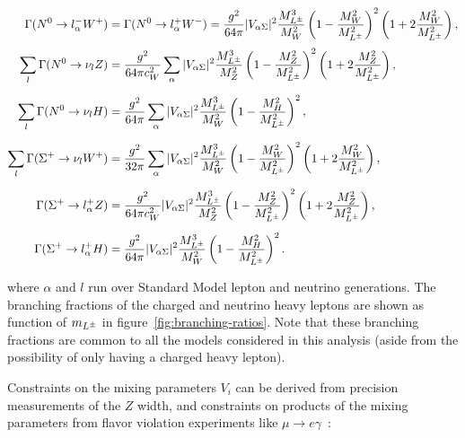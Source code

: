 %
\begin{align}
\label{eq:Gammatr0W}
\Gamma(\lzero \to l_\alpha^- W^+) &=  \Gamma(\lzero \to l_\alpha^+ W^-) =
\frac{g^2}{64 \pi} |V_{\alpha\Sigma}|^2
\frac{M_{\lpm}^3}{M_W^2} \left( 1- \frac{M_W^2}{M_{\lpm}^2} \right)^2 
\left( 1 + 2 \frac{M_W^2}{M_{\lpm}^2} \right) , 
\\[0.1cm]
\label{eq:Gammatr0Z}
\sum_l\Gamma(\lzero \to \nu_l Z) &=  \frac{g^2}{64 \pi c_W^2} 
\sum_\alpha |V_{\alpha\Sigma}|^2
\frac{M_{\lpm}^3}{M_Z^2} \left( 1- \frac{M_Z^2}{M_{\lpm}^2} \right)^2 
\left( 1 + 2 \frac{M_Z^2}{M_{\lpm}^2}\right),
\\[0.2cm]
\label{eq:Gammatr0h}
\sum_l\Gamma(\lzero \to \nu_l H) &=  \frac{g^2}{64 \pi} 
\sum_\alpha |V_{\alpha\Sigma}|^2
\frac{M_{\lpm}^3}{M_W^2} \left( 1- \frac{M_H^2}{M_{\lpm}^2} \right)^2 ,
\\[0.2cm]
\label{eq:Gammatr+W}
\sum_l\Gamma(\Sigma^+ \to \nu_l W^+) &= 
\frac{g^2}{32 \pi} \sum_\alpha |V_{\alpha\Sigma}|^2
\frac{M_{\lpm}^3}{M_W^2} \left( 1- \frac{M_W^2}{M_{\lpm}^2} \right)^2 
\left( 1 + 2 \frac{M_W^2}{M_{\lpm}^2} \right) ,
\\[0.2cm]
\label{eq:Gammatr+Z}
\Gamma(\Sigma^+ \to l_\alpha^+ Z) &= 
\frac{g^2}{64 \pi c_W^2} |V_{\alpha\Sigma}|^2
\frac{M_{\lpm}^3}{M_Z^2} \left( 1- \frac{M_Z^2}{M_{\lpm}^2} \right)^2 
\left( 1 + 2 \frac{M_Z^2}{M_{\lpm}^2}\right),
\\[0.2cm]
\label{eq:Gammatr+h}
\Gamma(\Sigma^+ \to l_\alpha^+ H) &= \frac{g^2}{64 \pi} |V_{\alpha\Sigma}|^2
\frac{M_{\lpm}^3}{M_W^2} \left( 1- \frac{M_H^2}{M_{\lpm}^2} \right)^2 .
\end{align}

where $\alpha$ and $l$ run over Standard Model lepton and neutrino generations. The branching fractions of the charged and neutrino heavy leptons are shown as function of $m_{L^{\pm}}$ in figure~\ref{fig:branching-ratios}. Note that these branching fractions are common to all the models considered in this analysis (aside from the possibility of only having a charged heavy lepton).



Constraints on the mixing parameters $V_i$ can be derived from precision measurements of the $Z$ width, and constraints on products of the mixing parameters from flavor violation experiments like $\mu\rightarrow e\gamma$~\cite{Abada:2008ea,Abada:2007ux,delAguila:2008pw,Altmannshofer:2013zba}:

